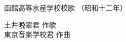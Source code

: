 \documentclass[10pt,b5j]{tarticle} %
\begin{document}
\begin{minipage}[c]{0.7\hsize} %
    \begin{center}
        {\LARGE
            函館高等水産学校校歌 %
        }
        {\small 
            （昭和十二年） %
        }
    \end{center}
\end{minipage}
\begin{minipage}[c]{0.3\hsize} %
    \begin{flushright} %
        土井晩翠君 作歌\\東京音楽学校君 作曲 %
    \end{flushright}
\end{minipage}
\end{document}
